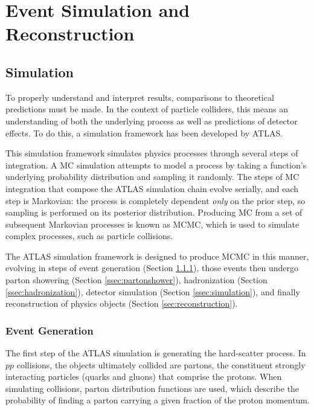 \chapter{Event Simulation and Reconstruction} \label{ch:eventreco}

\section{Simulation} \label{sec:simulation}

To properly understand and interpret results, comparisons to theoretical predictions must be made. In the context of particle colliders, this means an understanding of both the underlying process as well as predictions of detector effects. To do this, a simulation framework has been developed by ATLAS. 

This simulation framework simulates physics processes through several steps of  integration. A \gls{MC} simulation attempts to model a process by taking a function's underlying probability distribution and sampling it randomly. The steps of \gls{MC} integration that compose the ATLAS simulation chain evolve serially, and each step is Markovian: the process is completely dependent \textit{only} on the prior step, so sampling is performed on its posterior distribution. Producing \gls{MC} from a set of subsequent Markovian processes is known as \gls{MCMC}, which is used to simulate complex processes, such as particle collisions.

The ATLAS simulation framework is designed to produce \gls{MCMC} in this manner, evolving in steps of event generation (Section \ref{ssec:eventgen}), those events then undergo parton showering (Section \ref{ssec:partonshower}), hadronization (Section \ref{ssec:hadronization}), detector simulation (Section \ref{ssec:simulation}), and finally reconstruction of physics objects (Section \ref{sec:reconstruction}).

\subsection{Event Generation} \label{ssec:eventgen}
The first step of the ATLAS simulation is generating the hard-scatter process. In $pp$ collisions, the objects ultimately collided are partons, the constituent strongly interacting particles (quarks and gluons) that comprise the protons. When simulating collisions, parton distribution functions are used, which describe the probability of finding a parton carrying a given fraction of the proton momentum.



